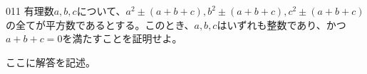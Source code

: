 \begin{thm}{011}{}{}
 有理数$a,b,c$について、$a^2\pm (a+b+c), b^2\pm (a+b+c), c^2\pm (a+b+c)$の全てが平方数であるとする。このとき、$a,b,c$はいずれも整数であり、かつ$a+b+c=0$を満たすことを証明せよ。
\end{thm}

ここに解答を記述。